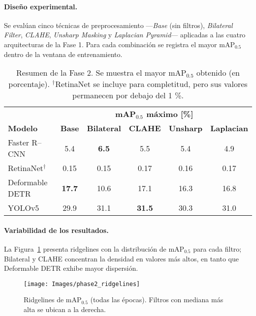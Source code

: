 \paragraph{Diseño experimental.}
Se evalúan cinco técnicas de preprocesamiento —\textit{Base} (sin filtros), \textit{Bilateral Filter}, \textit{CLAHE}, \textit{Unsharp Masking} y \textit{Laplacian Pyramid}— aplicadas a las cuatro arquitecturas de la Fase 1.
Para cada combinación se registra el mayor mAP\(_{0.5}\) dentro de la ventana de entrenamiento.

\begin{table}[!ht]
  \centering
  \begin{tabular}{lccccc}
    \hline
                     & \multicolumn{5}{c}{\textbf{mAP\(_{0.5}\) máximo [\%]}}\\
    \cline{2-6}
    \textbf{Modelo}  & \textbf{Base} & \textbf{Bilateral} & \textbf{CLAHE} & \textbf{Unsharp} & \textbf{Laplacian}\\
    \hline
    Faster R–CNN         & 5.4  & \textbf{6.5} & 5.5  & 5.4  & 4.9  \\
    RetinaNet$^\dagger$  & 0.15 & 0.15         & 0.17 & 0.16 & 0.17 \\
    Deformable DETR      & \textbf{17.7} & 10.6 & 17.1 & 16.3 & 16.8 \\
    YOLOv5               & 29.9 & 31.1 & \textbf{31.5} & 30.3 & 31.0 \\
    \hline
  \end{tabular}
  \caption[Mejor mAP por técnica de preprocesamiento]{Resumen de la Fase 2. Se muestra el mayor mAP\(_{0.5}\) obtenido (en porcentaje). $^\dagger$RetinaNet se incluye para completitud, pero sus valores permanecen por debajo del 1 \%.}
  \label{tab:fase2_map}
\end{table}


\paragraph{Variabilidad de los resultados.}
La Figura~\ref{fig:fase2_ridges} presenta ridgelines con la distribución de mAP\(_{0.5}\) para cada filtro; {\small Bilateral} y {\small CLAHE} concentran la densidad en valores más altos, en tanto que Deformable DETR exhibe mayor dispersión.

\begin{figure}[!ht]
  \centering
  \texttt{[image: Images/phase2\_ridgelines]}
  \caption[Distribución de mAP\(_{0.5}\) por filtro]{Ridgelines de mAP\(_{0.5}\) (todas las épocas). Filtros con mediana más alta se ubican a la derecha.}
  \label{fig:fase2_ridges}
\end{figure}

